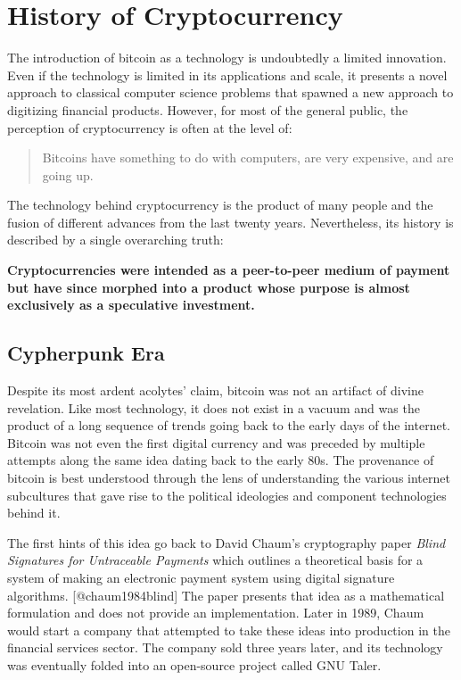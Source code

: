 \chapter{History of Cryptocurrency}


The introduction of bitcoin as a technology is undoubtedly a limited innovation.
Even if the technology is limited in its applications and scale, it presents a
novel approach to classical computer science problems that spawned a new
approach to digitizing financial products. However, for most of the general
public, the perception of cryptocurrency is often at the level of:

\begin{quote}
Bitcoins have something to do with computers, are very expensive, and are going up.
\end{quote}

The technology behind cryptocurrency is the product of many people and the
fusion of different advances from the last twenty years. Nevertheless, its
history is described by a single overarching truth:

\begin{infobox}
 \textbf{
    Cryptocurrencies were intended as a peer-to-peer medium of payment but have since morphed into a product whose purpose is almost exclusively as a speculative investment.
  }
\end{infobox}

\section{Cypherpunk Era}

Despite its most ardent acolytes' claim, bitcoin was not an artifact of divine
revelation. Like most technology, it does not exist in a vacuum and was the
product of a long sequence of trends going back to the early days of the
internet. Bitcoin was not even the first digital currency and was preceded by
multiple attempts along the same idea dating back to the early 80s. The
provenance of bitcoin is best understood through the lens of understanding the
various internet subcultures that gave rise to the political ideologies and
component technologies behind it.

The first hints of this idea go back to David Chaum's cryptography paper
\textit{Blind Signatures for Untraceable Payments} which outlines a theoretical
basis for a system of making an electronic payment system using digital
signature algorithms. [@chaum1984blind] The paper presents that idea as a
mathematical formulation and does not provide an implementation. Later in 1989,
Chaum would start a company that attempted to take these ideas into production
in the financial services sector. The company sold three years later, and its
technology was eventually folded into an open-source project called GNU Taler.

